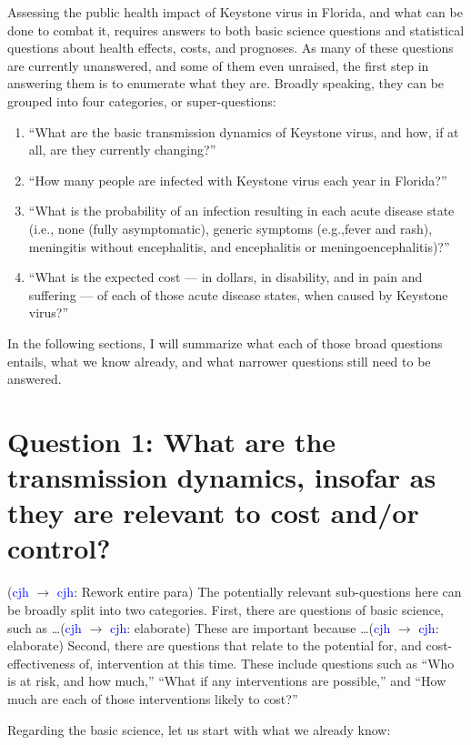 \documentclass{article}
\newcommand{\cjh}{\textcolor{blue}{cjh}}
\newcommand{\msg}[3]{(#1 $\rightarrow$ #2: #3)}
\newcommand{\mcc}[1]{\msg\cjh\cjh{#1}}
\begin{document}
        Assessing the public health impact of Keystone virus in Florida, and what can be done to combat it, requires answers to both basic science questions and statistical questions about health effects, costs, and prognoses. As many of these questions are currently unanswered, and some of them even unraised, the first step in answering them is to enumerate what they are. Broadly speaking, they can be grouped into four categories, or super-questions:
        \begin{enumerate}
            \item ``What are the basic transmission dynamics of Keystone virus, and how, if at all, are they currently changing?''
            \item ``How many people are infected with Keystone virus each year in Florida?''
            \item ``What is the probability of an infection resulting in each acute disease state (i.e., none (fully asymptomatic), generic symptoms (e.g.,fever and rash), meningitis without encephalitis, and encephalitis or meningoencephalitis)?''
            \item ``What is the expected cost --- in dollars, in disability, and in pain and suffering --- of each of those acute disease states, when caused by Keystone virus?''
        \end{enumerate}

        In the following sections, I will summarize what each of those broad questions entails, what we know already, and what narrower questions still need to be answered.

    \section[Transmission dynamics]{Question 1: What are the transmission dynamics, insofar as they are relevant to cost and/or control?}
        \mcc{Rework entire para}
        The potentially relevant sub-questions here can be broadly split into two categories. First, there are questions of basic science, such as \dots \mcc{elaborate} These are important because \dots \mcc{elaborate} Second, there are questions that relate to the potential for, and cost-effectiveness of, intervention at this time. These include questions such as ``Who is at risk, and how much,'' ``What if any interventions are possible,'' and ``How much are each of those interventions likely to cost?''

        Regarding the basic science, let us start with what we already know:
\end{document}
